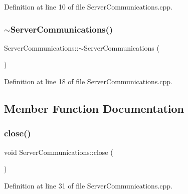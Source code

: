 Definition at line 10 of file Server\+Communications.\+cpp.

\hypertarget{classocra__recipes_1_1ServerCommunications_a1a24bf1fe5d2776e0cc9d3910ae226b9}{}\label{classocra__recipes_1_1ServerCommunications_a1a24bf1fe5d2776e0cc9d3910ae226b9} 
\subsubsection{\texorpdfstring{$\sim$\+Server\+Communications()}{~ServerCommunications()}}
{\footnotesize\ttfamily Server\+Communications\+::$\sim$\+Server\+Communications (\begin{DoxyParamCaption}{ }\end{DoxyParamCaption})\hspace{0.3cm}{\ttfamily [virtual]}}



Definition at line 18 of file Server\+Communications.\+cpp.



\subsection{Member Function Documentation}
\hypertarget{classocra__recipes_1_1ServerCommunications_a412d7330d0fcb83a51a105d4a261e5db}{}\label{classocra__recipes_1_1ServerCommunications_a412d7330d0fcb83a51a105d4a261e5db} 
\subsubsection{\texorpdfstring{close()}{close()}}
{\footnotesize\ttfamily void Server\+Communications\+::close (\begin{DoxyParamCaption}{ }\end{DoxyParamCaption})}



Definition at line 31 of file Server\+Communications.\+cpp.

\hypertarget{classocra__recipes_1_1ServerCommunications_afef1a369ff040f5c774cd5d9533a817f}{}\label{classocra__recipes_1_1ServerCommunications_afef1a369ff040f5c774cd5d9533a817f} 
